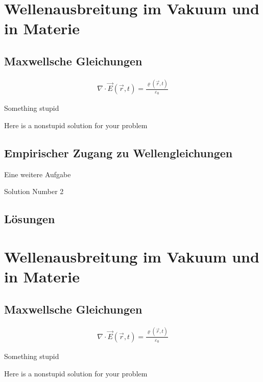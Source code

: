 \documentclass[a4paper]{article}
\begin{document}
\section{Wellenausbreitung im Vakuum und in Materie}
\subsection{Maxwellsche Gleichungen}

\begin{align*}
  \nabla \cdot \vec{E}\left(\vec{r}, t \right) =
    \frac{\varrho\left(\vec{r}, t \right)}{\varepsilon_0}
\end{align*}

\begin{exercise}[difficulty=easy]
Something stupid
\end{exercise}
\begin{solution}
Here is a nonstupid solution for your problem
\end{solution}

\subsection{Empirischer Zugang zu Wellengleichungen}

\begin{exercise}[difficulty=hard]
Eine weitere Aufgabe
\end{exercise}
\begin{solution}
Solution Number 2
\end{solution}

\subsection*{Lösungen}
\printsolutions[section,difficulty=hard]

\section{Wellenausbreitung im Vakuum und in Materie}
\subsection{Maxwellsche Gleichungen}

\begin{align*}
  \nabla \cdot \vec{E}\left(\vec{r}, t \right) =
    \frac{\varrho\left(\vec{r}, t \right)}{\varepsilon_0}
\end{align*}

\begin{exercise}[difficulty=easy]
Something stupid
\end{exercise}
\begin{solution}
Here is a nonstupid solution for your problem
\end{solution}
\end{document}
